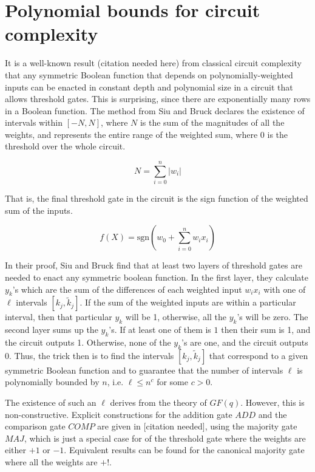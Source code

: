 \documentclass{article}
\begin{document}
\section{Polynomial bounds for circuit complexity}

It is a well-known result (citation needed here) from classical circuit
complexity that any symmetric Boolean function that depends on 
polynomially-weighted inputs can be enacted in constant depth and polynomial
size in a circuit
that allows threshold gates. This is surprising, since there are
exponentially many rows in a Boolean function. The method from Siu and Bruck
declares the existence of intervals within $[-N,N]$, where $N$ is the sum
of the magnitudes of all the weights, and represents the entire range
of the weighted sum, where $0$ is the threshold over the whole circuit.

\begin{equation}
N = \sum_{i=0}^n | w_i |
\end{equation}

That is, the final threshold gate in the circuit is the sign function of
the weighted sum of the inputs.

\begin{equation}
f(X) = \text{sgn} \left( w_0 + \sum_{i=0}^n w_i x_i \right)
\end{equation}

In their proof, Siu and Bruck find that at least two layers of threshold
gates are needed to enact any symmetric boolean function. In the first layer,
they calculate $y_k$'s which are the sum of the differences of each weighted
input $w_i x_i$ with one of $\ell$ intervals $[k_j, \tilde{k}_j]$. If the
sum of the weighted inputs are within a particular interval, then that particular
$y_k$ will be 1, otherwise, all the $y_k$'s will be zero.
The second layer sums up the $y_k$'s. If at least one of them is $1$ then their
sum is 1, and the circuit outputs 1. Otherwise, none of the $y_k$'s are one,
and the circuit outputs 0. Thus, the trick then is to find the intervals
$[k_j, \tilde{k}_j]$ that correspond to a given symmetric Boolean function and
to guarantee that the number of intervals $\ell$ is polynomially bounded by
$n$, i.e. $\ell \le n^c$ for some $c>0$.

The existence of such an $\ell$ derives from the theory of $GF(q)$. However,
this is non-constructive. Explicit constructions for the addition gate
$ADD$ and the comparison gate $COMP$ are given in [citation needed],
using the majority gate $MAJ$, which is just a special case for of the
threshold gate where the weights are either $+1$ or $-1$. Equivalent results
can be found for the canonical majority gate where all the weights are
$+!$.
\end{document}
